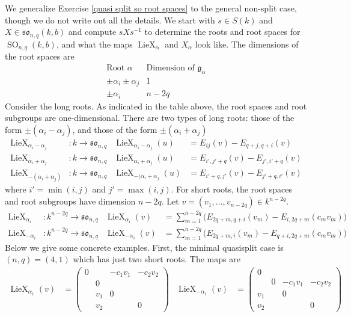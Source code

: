 \documentclass[12pt]{article}
\theoremstyle{definition}
\numberwithin{theorem}{subsection}
\newcommand{\inv}{^{-1}}
\newcommand{\frakg}{\mathfrak{g}}
\newcommand{\frakso}{\mathfrak{so}}
\DeclareMathOperator{\SO}{SO}
\DeclareMathOperator{\LieX}{LieX}
\begin{document}
We generalize Exercise \ref{quasi split so root spaces} to the general non-split case, though we do not write out all the details. We start with $s \in S(k)$ and $X \in \frakso_{n,q}(k,b)$ and compute $sXs \inv$ to determine the roots and root spaces for $\SO_{n,q}(k,b)$, and what the maps $\LieX_\alpha$ and $X_\alpha$ look like. The dimensions of the root spaces are
\[
	\begin{array}{c|c}
		\text{Root } \alpha & \text{Dimension of } \frakg_\alpha \\
		\hline
		\pm \alpha_i \pm \alpha_j & 1 \\
		\pm \alpha_i & n-2q
	\end{array}
\]
Consider the long roots. As indicated in the table above, the root spaces and root subgroups are one-dimensional. There are two types of long roots: those of the form $\pm (\alpha_i - \alpha_j)$, and those of the form $\pm (\alpha_i + \alpha_j)$
\begin{align*}
	\LieX_{\alpha_i - \alpha_j}&:k \to \frakso_{n,q} & \LieX_{\alpha_i - \alpha_j}(u) &= E_{ij}(v) - E_{q+j,q+i}(v) \\
	\LieX_{\alpha_i + \alpha_j}&:k \to \frakso_{n,q} & \LieX_{\alpha_i + \alpha_j}(u) &= E_{i',j'+q}(v) - E_{j',i'+q}(v) \\
	\LieX_{-(\alpha_i + \alpha_j)}&:k \to \frakso_{n,q} & \LieX_{-(\alpha_i + \alpha_j}(u) &= E_{i'+q,j'}(v) - E_{j'+q,i'}(v)
\end{align*}
where $i' = \min(i,j)$ and $j' = \max(i,j)$. For short roots, the root spaces and root subgroups have dimension $n-2q$. Let $v = (v_1, \ldots, v_{n-2q}) \in k^{n-2q}$.
\begin{align*}
	\LieX_{\alpha_i}&:k^{n-2q} \to \frakso_{n,q} & \LieX_{\alpha_i}(v) &= \sum_{m=1}^{n-2q} \Big( E_{2q+m, q+i}(v_m) - E_{i,2q+m}( c_m v_m) \Big) \\
	\LieX_{-\alpha_i}&:k^{n-2q} \to \frakso_{n,q} & \LieX_{-\alpha_i}(v) &= \sum_{m=1}^{n-2q} \Big( E_{2q+m, i}(v_m) - E_{q+i, 2q+m}(c_m v_m) \Big)
\end{align*}
Below we give some concrete examples. First, the minimal quasisplit case is $(n,q)= (4,1)$ which has just two short roots. The maps are
\begin{align*}
	\LieX_{\alpha_1}(v) &= 
	\begin{pmatrix}
		0 && -c_1 v_1 & -c_2 v_2 \\
		& 0 \\
		& v_1 & 0 \\
		& v_2 && 0 
	\end{pmatrix}
	&
	\LieX_{-\alpha_1}(v) &=
	\begin{pmatrix}
		0  \\
		& 0 & -c_1 v_1 & -c_2 v_2 \\
		v_1 && 0 \\
		v_2 &&& 0 
	\end{pmatrix}
\end{align*}
\end{document}
